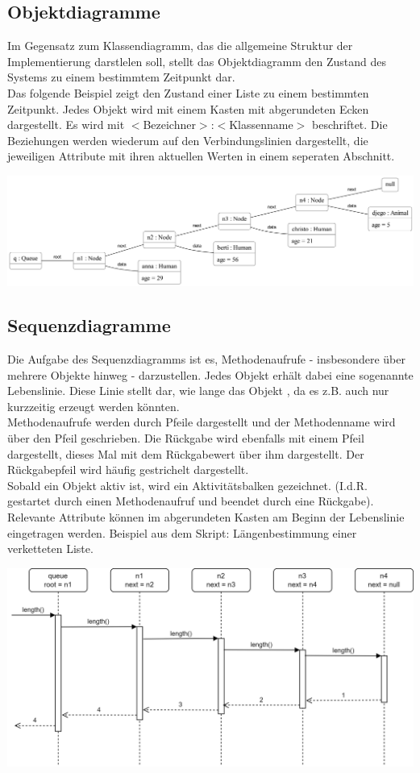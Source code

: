 \documentclass{article}
\begin{document}
\subsection{Objektdiagramme}

Im Gegensatz zum Klassendiagramm, das die allgemeine Struktur der Implementierung darstlelen soll, stellt das Objektdiagramm den Zustand des Systems zu einem bestimmtem Zeitpunkt dar.  \\ 
Das folgende Beispiel zeigt den Zustand einer Liste zu einem bestimmten Zeitpunkt. Jedes Objekt wird mit einem Kasten mit abgerundeten Ecken dargestellt. Es wird mit $<$Bezeichner$>$:$<$Klassenname$>$ beschriftet. Die Beziehungen werden wiederum auf den Verbindungslinien dargestellt, die jeweiligen Attribute mit ihren aktuellen Werten in einem seperaten Abschnitt. 

\begin{center}
    \includegraphics[scale=0.15]{../../media/linked_list_nodes_objectdiagram_v2.png}
\end{center}

\subsection{Sequenzdiagramme}

Die Aufgabe des Sequenzdiagramms ist es, Methodenaufrufe - insbesondere über mehrere Objekte hinweg - darzustellen. Jedes Objekt erhält dabei eine sogenannte Lebenslinie. Diese Linie stellt dar, wie lange das Objekt , da es z.B. auch nur kurzzeitig erzeugt werden könnten. \\
Methodenaufrufe werden durch Pfeile dargestellt und der Methodenname wird über den Pfeil geschrieben. Die Rückgabe wird ebenfalls mit einem Pfeil dargestellt, dieses Mal mit dem Rückgabewert über ihm dargestellt. Der Rückgabepfeil wird häufig gestrichelt dargestellt.\\
Sobald ein Objekt aktiv ist, wird ein Aktivitätsbalken gezeichnet. (I.d.R. gestartet durch einen Methodenaufruf und beendet durch eine Rückgabe). \\
Relevante Attribute können im abgerundeten Kasten am Beginn der Lebenslinie eingetragen werden.
Beispiel aus dem Skript: Längenbestimmung einer verketteten Liste.

\begin{center}
    \includegraphics[scale=0.2]{../../media/length_sequence.png}
\end{center}
\end{document}
